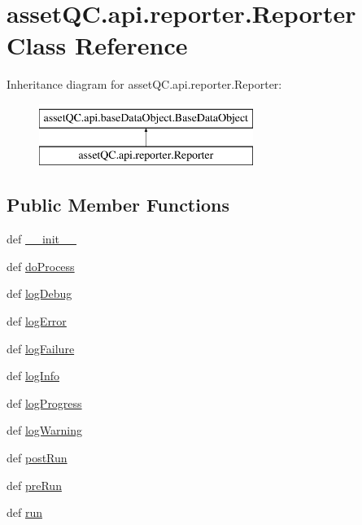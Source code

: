 \hypertarget{classassetQC_1_1api_1_1reporter_1_1Reporter}{\section{asset\-Q\-C.\-api.\-reporter.\-Reporter \-Class \-Reference}
\label{d6/d7a/classassetQC_1_1api_1_1reporter_1_1Reporter}
}
\-Inheritance diagram for asset\-Q\-C.\-api.\-reporter.\-Reporter\-:\begin{figure}[H]
\begin{center}
\leavevmode
\includegraphics[height=2.000000cm]{d6/d7a/classassetQC_1_1api_1_1reporter_1_1Reporter}
\end{center}
\end{figure}
\subsection*{\-Public \-Member \-Functions}
\begin{DoxyCompactItemize}
\item 
def \hyperlink{classassetQC_1_1api_1_1reporter_1_1Reporter_adb6ab4bc6fe9c38f821229aaa918da39}{\-\_\-\-\_\-init\-\_\-\-\_\-}
\item 
def \hyperlink{classassetQC_1_1api_1_1reporter_1_1Reporter_a1c17ab753e50299c8230996d220d38e4}{do\-Process}
\item 
def \hyperlink{classassetQC_1_1api_1_1reporter_1_1Reporter_ac5e72bd94862c8ff838099dcfb43512d}{log\-Debug}
\item 
def \hyperlink{classassetQC_1_1api_1_1reporter_1_1Reporter_ac5b32f5160245dce933f72f2fa69ae22}{log\-Error}
\item 
def \hyperlink{classassetQC_1_1api_1_1reporter_1_1Reporter_a5060e8eeee1a5dd3d8876e4afdf82863}{log\-Failure}
\item 
def \hyperlink{classassetQC_1_1api_1_1reporter_1_1Reporter_a8bfb63d17dbebd0d92f10bd13d53cc7e}{log\-Info}
\item 
def \hyperlink{classassetQC_1_1api_1_1reporter_1_1Reporter_af431f6a408338102b1fbd9d8e518beab}{log\-Progress}
\item 
def \hyperlink{classassetQC_1_1api_1_1reporter_1_1Reporter_a1f07b96adb52c9ef16b8949e3589ec16}{log\-Warning}
\item 
def \hyperlink{classassetQC_1_1api_1_1reporter_1_1Reporter_a10e1d98abaadf082a489f0b7b0bdd483}{post\-Run}
\item 
def \hyperlink{classassetQC_1_1api_1_1reporter_1_1Reporter_aa900b8d5de0c4b9b9bcc89a5ba6ec8ed}{pre\-Run}
\item 
def \hyperlink{classassetQC_1_1api_1_1reporter_1_1Reporter_a0289eb96ca2f3d0246a37e92d6c7912e}{run}
\end{DoxyCompactItemize}
